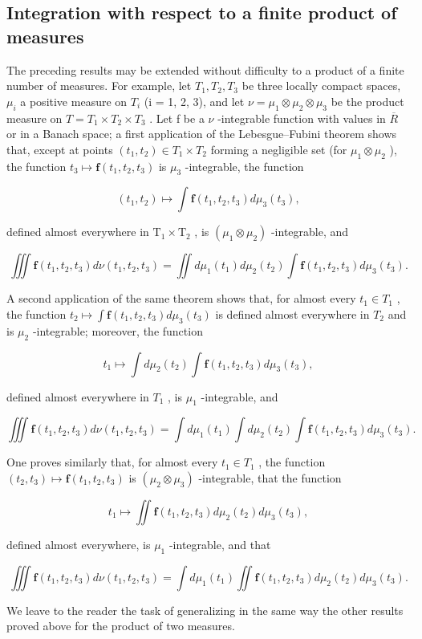\subsection{Integration with respect to a finite product of measures}

The preceding results may be extended without difficulty to a product of a finite number of measures. For example, let \(T_{1}, T_{2}, T_{3}\) be three locally compact spaces, \(\mu_{i}\) a positive measure on \(T_{i}\) (i = 1, 2, 3), and let \(\nu = \mu_{1} \otimes \mu_{2} \otimes \mu_{3}\) be the product measure on \(T = T_{1} \times T_{2} \times T_{3}\) . Let f be a \(\nu\) -integrable function with values in \(\overline{R}\) or in a Banach space; a first application of the Lebesgue--Fubini theorem shows that, except at points \((t_{1}, t_{2}) \in T_{1} \times T_{2}\) forming a negligible set (for \(\mu_{1} \otimes \mu_{2}\) ), the function \(t_{3} \mapsto \mathbf{f}(t_{1}, t_{2}, t_{3})\) is \(\mu_{3}\) -integrable, the function

\[
(t _ {1}, t _ {2}) \mapsto \int \mathbf {f} (t _ {1}, t _ {2}, t _ {3}) d \mu_ {3} (t _ {3}),
\]

defined almost everywhere in \(\mathrm{T}_1\times \mathrm{T}_2\) , is \((\mu_{1}\otimes \mu_{2})\) -integrable, and

\[
\iiint \mathbf {f} (t _ {1}, t _ {2}, t _ {3}) d \nu (t _ {1}, t _ {2}, t _ {3}) = \iint d \mu_ {1} (t _ {1}) d \mu_ {2} (t _ {2}) \int \mathbf {f} (t _ {1}, t _ {2}, t _ {3}) d \mu_ {3} (t _ {3}).
\]

A second application of the same theorem shows that, for almost every \(t_{1} \in T_{1}\) , the function \(t_{2} \mapsto \int \mathbf{f}(t_{1}, t_{2}, t_{3}) d\mu_{3}(t_{3})\) is defined almost everywhere in \(T_{2}\) and is \(\mu_{2}\) -integrable; moreover, the function

\[
t _ {1} \mapsto \int d \mu_ {2} (t _ {2}) \int \mathbf {f} (t _ {1}, t _ {2}, t _ {3}) d \mu_ {3} (t _ {3}),
\]

defined almost everywhere in \(T_{1}\) , is \(\mu_{1}\) -integrable, and

\[
\iiint \mathbf {f} (t _ {1}, t _ {2}, t _ {3}) d \nu (t _ {1}, t _ {2}, t _ {3}) = \int d \mu_ {1} (t _ {1}) \int d \mu_ {2} (t _ {2}) \int \mathbf {f} (t _ {1}, t _ {2}, t _ {3}) d \mu_ {3} (t _ {3}).
\]

One proves similarly that, for almost every \(t_{1} \in T_{1}\) , the function \((t_{2}, t_{3}) \mapsto \mathbf{f}(t_{1}, t_{2}, t_{3})\) is \((\mu_{2} \otimes \mu_{3})\) -integrable, that the function

\[
t _ {1} \mapsto \iint \mathbf {f} (t _ {1}, t _ {2}, t _ {3}) d \mu_ {2} (t _ {2}) d \mu_ {3} (t _ {3}),
\]

defined almost everywhere, is \(\mu_{1}\) -integrable, and that

\[
\iiint \mathbf {f} (t _ {1}, t _ {2}, t _ {3}) d \nu (t _ {1}, t _ {2}, t _ {3}) = \int d \mu_ {1} (t _ {1}) \iint \mathbf {f} (t _ {1}, t _ {2}, t _ {3}) d \mu_ {2} (t _ {2}) d \mu_ {3} (t _ {3}).
\]

We leave to the reader the task of generalizing in the same way the other results proved above for the product of two measures.

